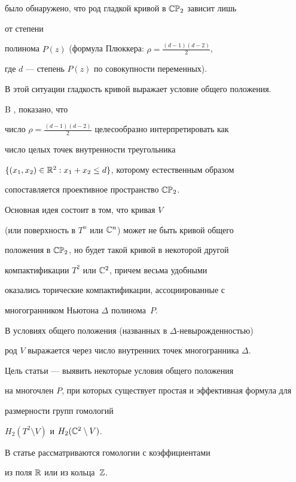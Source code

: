 было обнаружено, что род гладкой кривой в ${\Bbb{CP}}_2$ зависит лишь


от степени


полинома $P(z)$ (формула Плюккера: $\rho = \frac{(d-1)(d-2)}{2}$,


где $d$ --- степень $P(z)$ по совокупности переменных).


В этой ситуации гладкость кривой выражает условие общего положения.


B \cite{H1}, \cite{H2} показано, что


число $\rho = \frac{(d-1)(d-2)}{2}$  целесообразно интерпретировать как


число целых точек внутренности треугольника


$\{(x_1,x_2)\in \Bbb R^2: x_1+x_2\le d\}$, которому естественным образом


сопоставляется проективное пространство $\Bbb{CP}_2$.


Основная идея \cite{H1} состоит в том, что кривая $V$


(или поверхность в $T^n$ или $\Bbb C^n$) может не быть кривой общего


положения в $\Bbb{CP}_2$, но будет такой кривой в некоторой другой


компактификации $T^2$ или $\Bbb C^2$, причем весьма удобными


оказались торические компактификации, ассоциированные с


многогранником Ньютона $\Delta$ полинома~$P$.


В условиях общего положения (названных в \cite{H1} $\Delta$-невырожденностью)


род $V$ выражается через число внутренних точек многогранника $\Delta$.





Цель статьи --- выявить некоторые условия общего положения


на многочлен $P$, при которых существует простая и эффективная формула для


размерности групп гомологий


$H_2(T^2\setminus V)$ и $H_2(\Bbb C^2\setminus V)$.





В статье рассматриваются гомологии с коэффициентами


из поля $\Bbb R$ или из кольца~$\Bbb Z$.





